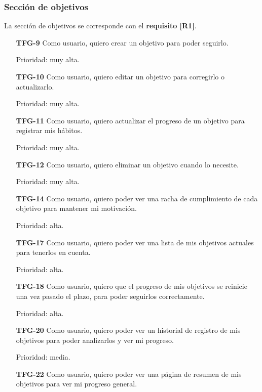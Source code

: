 \documentclass[10pt, a4paper]{aqademic}
\begin{document}
\subsubsection*{Sección de objetivos}

La sección de objetivos se corresponde con el \textbf{requisito [R1]}.

\begin{itemize}[leftmargin=16mm]
	\item [\textbf{TFG-9}] Como usuario, quiero crear un objetivo para poder seguirlo.
	
	Prioridad: muy alta.
	
	\item [\textbf{TFG-10}] Como usuario, quiero editar un objetivo para corregirlo o actualizarlo.
	
	Prioridad: muy alta.
	
	\item [\textbf{TFG-11}] Como usuario, quiero actualizar el progreso de un objetivo para registrar mis hábitos.
	
	Prioridad: muy alta.
	
	\item [\textbf{TFG-12}] Como usuario, quiero eliminar un objetivo cuando lo necesite.
	
	Prioridad: muy alta.
	
	\item [\textbf{TFG-14}] Como usuario, quiero poder ver una racha de cumplimiento de cada objetivo para mantener mi motivación.
	
	Prioridad: alta.
	
	\item [\textbf{TFG-17}] Como usuario, quiero poder ver una lista de mis objetivos actuales para tenerlos en cuenta.
	
	Prioridad: alta.
	
	\item [\textbf{TFG-18}] Como usuario, quiero que el progreso de mis objetivos se reinicie una vez pasado el plazo, para poder seguirlos correctamente.
	
	Prioridad: alta.
	
	\item [\textbf{TFG-20}] Como usuario, quiero poder ver un historial de registro de mis objetivos para poder analizarlos y ver mi progreso.
	
	Prioridad: media.
	
	\item [\textbf{TFG-22}] Como usuario, quiero poder ver una página de resumen de mis objetivos para ver mi progreso general.
	

\end{itemize}
\end{document}
